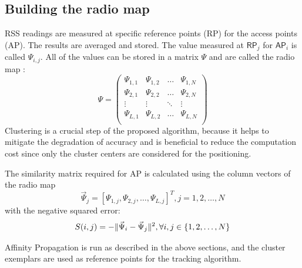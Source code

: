 \documentclass[11pt,a4paper]{article}
\DeclarePairedDelimiter\norm{\lVert}{\rVert}
\begin{document}
\subsection{Building the radio map}
RSS readings are measured at specific reference points (RP) for the access points (AP). The results are averaged and stored. The value measured at $\mathsf{RP}_j$ for $\mathsf{AP}_i$ is called $\Psi_{i,j}$. All of the values can be stored in a matrix $\Psi$ and are called the radio map \cite{tian2013fingerprint}:
\[\Psi =
	\left( \begin{array}{cccc}
			\Psi_{1,1} & \Psi_{1,2} & \dots  & \Psi_{1,N} \\
			\Psi_{2,1} & \Psi_{2,2} & \dots  & \Psi_{2,N} \\
			\vdots     & \vdots     & \ddots & \vdots     \\
			\Psi_{L,1} & \Psi_{L,2} & \dots  & \Psi_{L,N} \\
		\end{array}\right)
\]
Clustering is a crucial step of the proposed algorithm, because it helps to mitigate the degradation of accuracy and is beneficial to reduce the computation cost since only the cluster centers are considered for the positioning. \cite{tian2013fingerprint}

The similarity matrix required for AP is calculated using the column vectors of the radio map
\[
	\vec{\Psi}_j = \left[\Psi_{1,j}, \Psi_{2,j}, \dots , \Psi_{L,j}\right]^T, j=1,2,\dots , N
\]
with the negative squared error:
\[
	S(i,j) = -\norm{\vec{\Psi}_i - \vec{\Psi}_j}^2, \forall i,j \in \{ 1,2,\dots , N \}
\]

Affinity Propagation is run as described in the above sections, and the cluster exemplars are used as reference points for the tracking algorithm.
\end{document}
